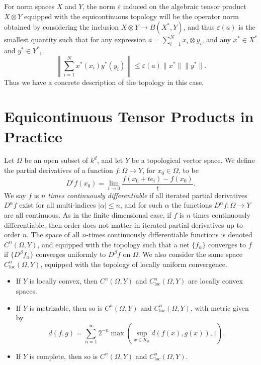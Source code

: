 For norm spaces $X$ and $Y$, the norm $\varepsilon$ induced on the algebraic tensor product $X \otimes Y$ equipped with the equicontinuous topology will be the operator norm obtained by considering the inclusion $X \otimes Y \to B(X^*,Y)$, and thus $\varepsilon(a)$ is the smallest quantity such that for any expression $a = \sum_{i = 1}^N x_i \otimes y_i$, and any $x^* \in X^*$ and $y^* \in Y^*$,
%
\[ \left\| \sum_{i = 1}^N x^*(x_i) y^*(y_i) \right\| \leq \varepsilon(a) \| x^* \| \| y^* \|.  \]
%
Thus we have a concrete description of the topology in this case.

\section{Equicontinuous Tensor Products in Practice}

Let $\Omega$ be an open subset of $k^d$, and let $Y$ be a topological vector space. We define the partial derivatives of a function $f: \Omega \to Y$, for $x_0 \in \Omega$, to be
%
\[ D^i f(x_0) = \lim_{t \to 0} \frac{f(x_0 + t e_i) - f(x_0)}{t}. \]
%
We say $f$ is \emph{$n$ times continuously differentiable} if all iterated partial derivatives $D^\alpha f$ exist for all multi-indices $|\alpha| \leq n$, and for such $\alpha$ the functions $D^\alpha f: \Omega \to Y$ are all continuous. As in the finite dimensional case, if $f$ is $n$ times continuously differentiable, then order does not matter in iterated partial derivatives up to order $n$. The space of all $n$-times continuously differentiable functions is denoted $C^n(\Omega,Y)$, and equipped with the topology such that a net $\{ f_\alpha \}$ converges to $f$ if $\{ D^\beta f_\alpha \}$ converges uniformly to $D^\beta f$ on $\Omega$. We also consider the same space $C^n_{\text{loc}}(\Omega,Y)$, equipped with the topology of locally uniform convergence.
%
\begin{itemize}
    \item If $Y$ is locally convex, then $C^n(\Omega,Y)$ and $C^n_{\text{loc}}(\Omega,Y)$ are locally convex spaces.

    \item If $Y$ is metrizable, then so is $C^n(\Omega,Y)$ and $C^n_{\text{loc}}(\Omega,Y)$, with metric given by
    \[ d(f,g) = \sum_{n = 1}^\infty 2^{-n} \max \left( \sup_{x \in K_n} d(f(x),g(x)), 1 \right). \]

    \item If $Y$ is complete, then so is $C^n(\Omega,Y)$ and $C^n_{\text{loc}}(\Omega,Y)$.
\end{itemize}

